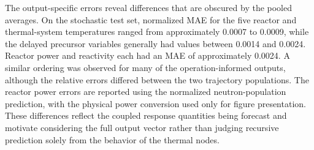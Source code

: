 The output-specific errors reveal differences that are obscured by the pooled averages. On the stochastic test set, normalized MAE for the five reactor and thermal-system temperatures ranged from approximately 0.0007 to 0.0009, while the delayed precursor variables generally had values between 0.0014 and 0.0024. Reactor power and reactivity each had an MAE of approximately 0.0024. A similar ordering was observed for many of the operation-informed outputs, although the relative errors differed between the two trajectory populations. The reactor power errors are reported using the normalized neutron-population prediction, with the physical power conversion used only for figure presentation. These differences reflect the coupled response quantities being forecast and motivate considering the full output vector rather than judging recursive prediction solely from the behavior of the thermal nodes.

\begin{table}[!htbp]
\centering
\footnotesize
\setlength{\tabcolsep}{4.5pt}
\renewcommand{\arraystretch}{1.08}
\captionsetup{skip=3pt}
\caption{Normalized forecast accuracy across all 15 output variables. Errors are divided by the original training ranges. Pooled values span all 15 outputs.}
\label{tab:mace_forecast_accuracy}
\end{table}

